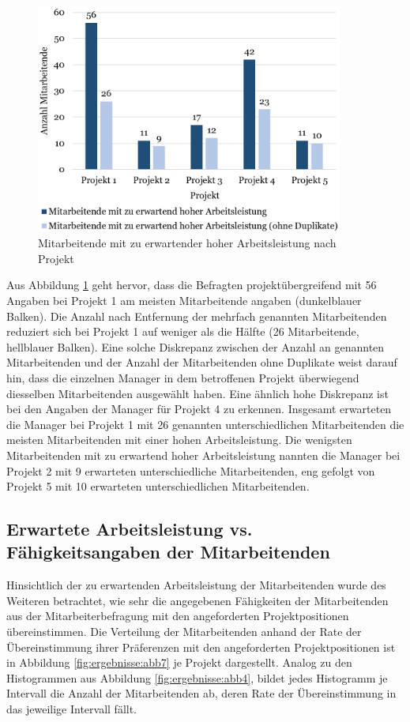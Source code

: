 \begin{figure}
    \centering
	\includegraphics[width=0.9\textwidth]{gfx/verteilung-m-prod.png}
	\caption[Mitarbeitende mit zu erwartender hoher Arbeitsleistung nach Projekt]{Mitarbeitende mit zu erwartender hoher Arbeitsleistung nach Projekt}
	\label{fig:ergebnisse:abb5}
\end{figure}

Aus Abbildung \ref{fig:ergebnisse:abb5} geht hervor, dass die Befragten projektübergreifend mit 56 Angaben bei Projekt 1 am meisten Mitarbeitende angaben (dunkelblauer Balken).
Die Anzahl nach Entfernung der mehrfach genannten Mitarbeitenden reduziert sich bei Projekt 1 auf weniger als die Hälfte (26 Mitarbeitende, hellblauer Balken).
Eine solche Diskrepanz zwischen der Anzahl an genannten Mitarbeitenden und der Anzahl der Mitarbeitenden ohne Duplikate weist darauf hin, dass die einzelnen Manager in dem betroffenen Projekt überwiegend diesselben Mitarbeitenden ausgewählt haben.
Eine ähnlich hohe Diskrepanz ist bei den Angaben der Manager für Projekt 4 zu erkennen.
Insgesamt erwarteten die Manager bei Projekt 1 mit 26 genannten unterschiedlichen Mitarbeitenden die meisten Mitarbeitenden mit einer hohen Arbeitsleistung.
Die wenigsten Mitarbeitenden mit zu erwartend hoher Arbeitsleistung nannten die Manager bei Projekt 2 mit 9 erwarteten unterschiedliche Mitarbeitenden, eng gefolgt von Projekt 5 mit 10 erwarteten unterschiedlichen Mitarbeitenden.

\subsection{Erwartete Arbeitsleistung vs. Fähigkeitsangaben der Mitarbeitenden}
Hinsichtlich der zu erwartenden Arbeitsleistung der Mitarbeitenden wurde des Weiteren betrachtet, wie sehr die angegebenen Fähigkeiten der Mitarbeitenden aus der Mitarbeiterbefragung mit den angeforderten Projektpositionen übereinstimmen.
Die Verteilung der Mitarbeitenden anhand der Rate der Übereinstimmung ihrer Präferenzen mit den angeforderten Projektpositionen ist in Abbildung \ref{fig:ergebnisse:abb7} je Projekt dargestellt.
Analog zu den Histogrammen aus Abbildung \ref{fig:ergebnisse:abb4}, bildet jedes Histogramm je Intervall die Anzahl der Mitarbeitenden ab, deren Rate der Übereinstimmung in das jeweilige Intervall fällt.

